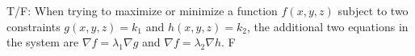 {T/F: When trying to maximize or minimize a function $f(x,y,z)$ subject to two constraints $g(x,y,z) = k_1$ and $h(x,y,z) = k_2$, the additional two equations in the system are $\nabla f = \lambda_1 \nabla g$ and $\nabla f = \lambda_2 \nabla h$.
}
{F}
